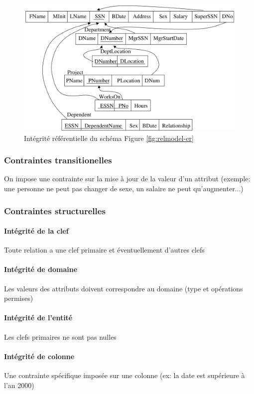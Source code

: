 \documentclass[a4paper]{article}
\begin{document}
\begin{figure}[H]
    \center
    \includegraphics[width=.7\textwidth]{fig/integrite-rel.png}
    \caption{Intégrité référentielle du schéma Figure \ref{fig:relmodel-er}}
\end{figure}

\subsubsection{Contraintes transitionelles}
On impose une contrainte sur la mise à jour de la valeur d'un attribut (exemple:
une personne ne peut pas changer de sexe, un salaire ne peut qu'augmenter...)

\subsubsection{Contraintes structurelles}
\paragraph{Intégrité de la clef}
Toute relation a une clef primaire et éventuellement d'autres clefs

\paragraph{Intégrité de domaine}
Les valeurs des attributs doivent correspondre au domaine (type et opérations permises)

\paragraph{Intégrité de l'entité}
Les clefs primaires ne sont pas nulles

\paragraph{Intégrité de colonne}
Une contrainte spécifique imposée sur une colonne (ex: la date est supérieure à l'an 2000)
\end{document}
